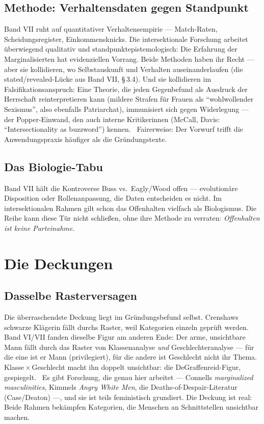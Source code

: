 \subsection{Methode: Verhaltensdaten gegen Standpunkt}

Band VII ruht auf quantitativer Verhaltensempirie --- Match-Raten,
Scheidungsregister, Einkommensknicks. Die intersektionale Forschung arbeitet
überwiegend qualitativ und standpunktepistemologisch: Die Erfahrung der
Marginalisierten hat evidenziellen Vorrang. Beide Methoden haben ihr Recht ---
aber sie kollidieren, wo Selbstauskunft und Verhalten auseinanderlaufen (die
stated/revealed-Lücke aus Band VII, §\,3.4). Und sie kollidieren im
Falsifikationsanspruch: Eine Theorie, die jeden Gegenbefund als Ausdruck der
Herrschaft reinterpretieren kann (mildere Strafen für Frauen als
\enquote{wohlwollender Sexismus}, also ebenfalls Patriarchat), immunisiert
sich gegen Widerlegung --- der Popper-Einwand, den auch interne Kritikerinnen
(McCall, Davis: \enquote{Intersectionality as buzzword}) kennen. \umstritten\
Fairerweise: Der Vorwurf trifft die Anwendungspraxis häufiger als die
Gründungstexte.

\subsection{Das Biologie-Tabu}

Band VII hält die Kontroverse Buss vs.\ Eagly/Wood offen --- evolutionäre
Disposition oder Rollenanpassung, die Daten entscheiden es nicht. Im
intersektionalen Rahmen gilt schon das Offenhalten vielfach als Biologismus.
Die Reihe kann diese Tür nicht schließen, ohne ihre Methode zu verraten:
\emph{Offenhalten ist keine Parteinahme.} \plausibel

\section{Die Deckungen}

\subsection{Dasselbe Rasterversagen}

Die überraschendste Deckung liegt im Gründungsbefund selbst. Crenshaws
schwarze Klägerin fällt durchs Raster, weil Kategorien einzeln geprüft werden.
Band VI/VII fanden dieselbe Figur am anderen Ende: Der arme, unsichtbare Mann
fällt durch das Raster von Klassenanalyse \emph{und} Geschlechteranalyse ---
für die eine ist er Mann (privilegiert), für die andere ist Geschlecht nicht
ihr Thema. Klasse\,$\times$\,Geschlecht macht ihn doppelt unsichtbar: die
DeGraffenreid-Figur, gespiegelt. \plausibel\ Es gibt Forschung, die genau hier
arbeitet --- Connells \textit{marginalized masculinities}, Kimmels
\textit{Angry White Men}, die Deaths-of-Despair-Literatur (Case/Deaton) ---,
und sie ist teils feministisch grundiert. Die Deckung ist real: Beide Rahmen
bekämpfen Kategorien, die Menschen an Schnittstellen unsichtbar machen.

